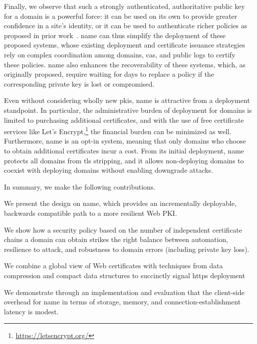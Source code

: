 Finally, we observe that such a strongly authenticated, authoritative public key
for a domain is a powerful force: it can be used on its own to provide greater
confidence in a site's identity, or it can be used to authenticate richer
policies as proposed in prior work~\cite{basin2014arpki,
szalachowski2014policert}. \ac{name} can thus simplify the deployment of these
proposed systems, whose existing deployment and certificate issuance strategies
rely on complex coordination among domains, \acp{ca}, and public logs to certify
these policies. \ac{name} also enhances the recoverability of these systems,
which, as originally proposed, require waiting for days to replace a policy if
the corresponding private key is lost or compromised.

Even without considering wholly new \acp{pki}, \ac{name} is attractive from a
deployment standpoint. In particular, the administrative burden of deployment
for domains is limited to purchasing additional certificates, and with the use
of free certificate services like Let's
Encrypt,\footnote{\url{https://letsencrypt.org/}} the financial burden can be
minimized as well. Furthermore, \ac{name} is an opt-in system, meaning that only
domains who choose to obtain additional certificates incur a cost. From its
initial deployment, \ac{name} protects all domains from \ac{tls} stripping, and
it allows non-deploying domains to coexist with deploying domains without
enabling downgrade attacks.

In summary, we make the following contributions.
\begin{compactitem}
\item We present the design on \ac{name}, which provides an incrementally deployable,
      backwards compatible path to a more resilient Web PKI.
\item We show how a security policy based on the number of independent certificate chains
      a domain can obtain strikes the right balance between automation, 
      resilience to attack, and robustness to domain errors (including private key loss).
\item We combine a global view of Web certificates with techniques from data
      compression and compact data structures to succinctly signal \ac{https} deployment
\item We demonstrate through an implementation and evaluation that the client-side overhead for
      \ac{name} in terms of storage, memory, and connection-establishment latency is
      modest. 
\end{compactitem}

